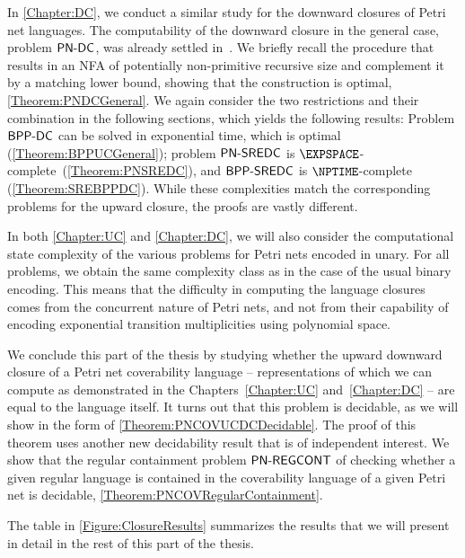 \documentclass[../../diss.tex]{subfiles}
\begin{document}
In \cref{Chapter:DC}, we conduct a similar study for the downward closures of Petri net languages.
The computability of the downward closure in the general case, problem $\mathsf{PN\text{-}DC}$, was already settled in~\cite{HabermehlMW10}.
We briefly recall the procedure that results in an NFA of potentially non-primitive recursive size and complement it by a matching lower bound, showing that the construction is optimal, \cref{Theorem:PNDCGeneral}.
We again consider the two restrictions and their combination in the following sections, which yields the following results:
Problem $\mathsf{BPP\text{-}DC}$ can be solved in exponential time, which is optimal (\cref{Theorem:BPPUCGeneral}); problem $\mathsf{PN\text{-}SREDC}$ is $\EXPSPACE$-complete~(\cref{Theorem:PNSREDC}), and $\mathsf{BPP\text{-}SREDC}$ is $\NPTIME$-complete (\cref{Theorem:SREBPPDC}).
While these complexities match the corresponding problems for the upward closure, the proofs are vastly different.

In both \cref{Chapter:UC} and \cref{Chapter:DC}, we will also consider the computational \resp state complexity of the various problems for Petri nets encoded in unary.
For all problems, we obtain the same complexity class as in the case of the usual binary encoding.
This means that the difficulty in computing the language closures comes from the concurrent nature of Petri nets, and not from their capability of encoding exponential transition multiplicities using polynomial space.

We conclude this part of the thesis by studying whether the upward \resp downward closure of a Petri net coverability language -- representations of which we can compute as demonstrated in the Chapters~\ref{Chapter:UC} and~\ref{Chapter:DC} -- are equal to the language itself.
It turns out that this problem is decidable, as we will show in the form of \cref{Theorem:PNCOVUCDCDecidable}.
The proof of this theorem uses another new decidability result that is of independent interest.
We show that the regular containment problem $\mathsf{PN\text{-}REGCONT}$ of checking whether a given regular language is contained in the coverability language of a given Petri net is decidable, \cref{Theorem:PNCOVRegularContainment}.

The table in \cref{Figure:ClosureResults} summarizes the results that we will present in detail in the rest of this part of the thesis.

\let\oldarraystretch\arraystretch%
\def\arraystretch{1.5}%
\end{document}

